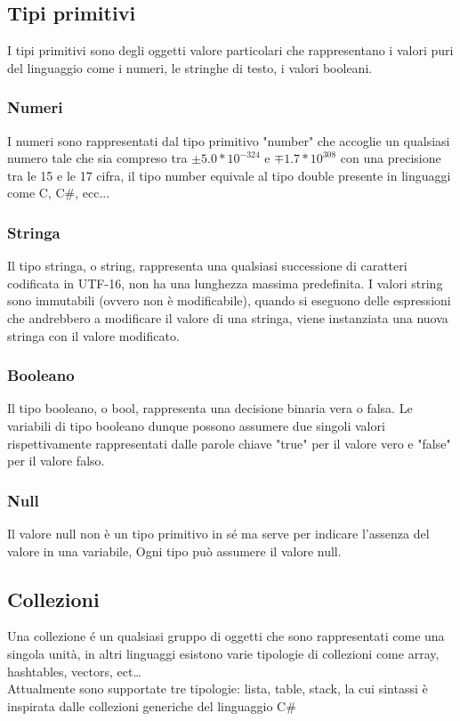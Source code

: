 \subsection{Tipi primitivi}
I tipi primitivi sono degli oggetti valore particolari che rappresentano i valori puri del linguaggio come
i numeri, le stringhe di testo, i valori booleani.

\subsubsection{Numeri}
I numeri sono rappresentati dal tipo primitivo "number" che accoglie un qualsiasi numero tale che
sia compreso tra \( \pm5.0*10^{-324} \) e \(\mp 1.7*10^{308}\) con una precisione tra le 15 e le 17
cifra, il tipo number equivale al tipo double presente in linguaggi come C, C\#, ecc...

\subsubsection{Stringa}
Il tipo stringa, o string, rappresenta una qualsiasi successione di caratteri codificata in UTF-16, 
non ha una lunghezza massima predefinita.
I valori string sono immutabili (ovvero non è modificabile), quando si eseguono delle espressioni
che andrebbero a modificare il valore di una stringa, viene instanziata una nuova stringa con il valore
modificato.

\subsubsection{Booleano}
Il tipo booleano, o bool, rappresenta una decisione binaria vera o falsa.
Le variabili di tipo booleano dunque possono assumere due singoli valori rispettivamente 
rappresentati dalle parole chiave "true" per il valore vero e "false" per il valore falso.

\subsubsection{Null}
Il valore null non è un tipo primitivo in sé ma serve per indicare l'assenza del valore in una variabile,
Ogni tipo può assumere il valore null.

\subsection{Collezioni} %
Una collezione é un qualsiasi gruppo di oggetti che sono rappresentati come una singola unità,
in altri linguaggi esistono varie tipologie di collezioni come array, hashtables, vectors, ect\dots \\
Attualmente sono supportate tre tipologie: lista, table, stack, la cui sintassi è inspirata dalle
collezioni generiche del linguaggio C\#

